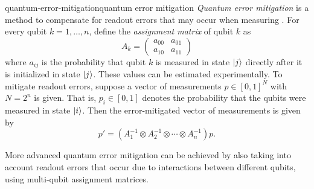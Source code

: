 \begin{topic}{quantum-error-mitigation}{quantum error mitigation}
    \emph{Quantum error mitigation} is a method to compensate for readout errors that may occur when measuring . For every qubit $k = 1, \ldots, n$, define the \textit{assignment matrix} of qubit $k$ as
    \[ A_k = \begin{pmatrix} a_{00} & a_{01} \\ a_{10} & a_{11} \end{pmatrix} \]
    where $a_{ij}$ is the probability that qubit $k$ is measured in state $|j\rangle$ directly after it is initialized in state $|j\rangle$. These values can be estimated experimentally. To mitigate readout errors, suppose a vector of measurements $p \in [0, 1]^{N}$ with $N = 2^n$ is given. That is, $p_i \in [0, 1]$ denotes the probability that the qubits were measured in state $|i\rangle$. Then the error-mitigated vector of measurements is given by
    \[ p' = (A_1^{-1} \otimes A_2^{-1} \otimes \cdots \otimes A_{n}^{-1}) p . \]
    
    More advanced quantum error mitigation can be achieved by also taking into account readout errors that occur due to interactions between different qubits, using multi-qubit assignment matrices.
\end{topic}

